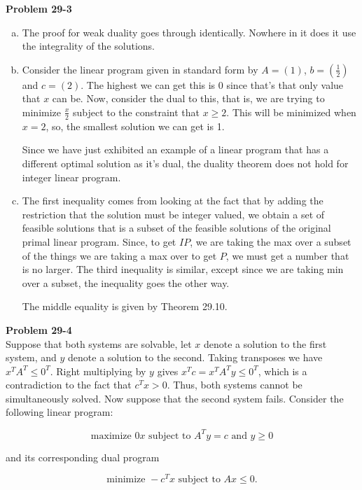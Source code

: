 \documentclass{article}
\begin{document}
\noindent\textbf{Problem 29-3}\\

\begin{enumerate}[a.]
\item The proof for weak duality goes through identically. Nowhere in it does it use the integrality of the solutions.
\item Consider the linear program given in standard form by $A = \left(1\right)$, $b = \left(\frac{1}{2}\right)$ and $c = \left( 2 \right)$. The highest we can get this is $0$ since that's that only value that $x$ can be. Now, consider the dual to this, that is, we are trying to minimize $\frac{x}{2}$ subject to the constraint that $x \ge 2$. This will be minimized when $x=2$, so, the smallest solution we can get is 1.

Since we have just exhibited an example of a linear program that has a different optimal solution as it's dual, the duality theorem does not hold for integer linear program.
\item
The first inequality comes from looking at the fact that by adding the restriction that the solution must be integer valued, we obtain a set of feasible solutions that is a subset of the feasible solutions of the original primal linear program. Since, to get $IP$, we are taking the max over a subset of the things we are taking a max over to get $P$, we must get a number that is no larger. The third inequality is similar, except since we are taking min over a subset, the inequality goes the other way.

The middle equality is given by Theorem 29.10.
\end{enumerate}

\noindent\textbf{Problem 29-4} \\

Suppose that both systems are solvable, let $x$ denote a solution to the first system, and $y$ denote a solution to the second. Taking transposes we have $x^TA^T \leq 0^T$.  Right multiplying by $y$ gives $x^Tc = x^TA^Ty \leq 0^T$, which is a contradiction to the fact that $c^Tx > 0$.  Thus, both systems cannot be simultaneously solved.  Now suppose that the second system fails.  Consider the following linear program:

\[ \mbox{maximize } 0x \mbox{ subject to } A^Ty = c \mbox{ and } y \geq 0 \]

and its corresponding dual program

\[ \mbox{minimize } -c^Tx \mbox{ subject to } Ax \leq 0.\]
\end{document}
